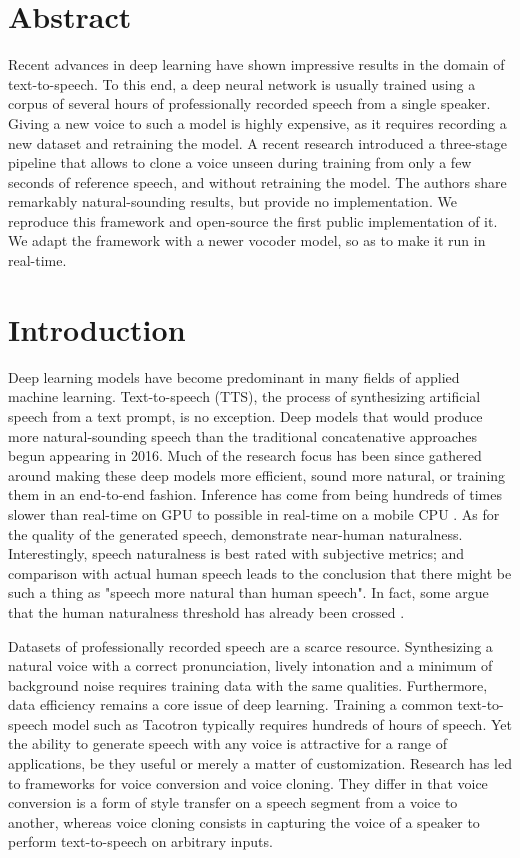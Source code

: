 \documentclass[a4paper, oneside, 12pt, english]{article}
\begin{document}
\section*{Abstract}
Recent advances in deep learning have shown impressive results in the domain of text-to-speech. To this end, a deep neural network is usually trained using a corpus of several hours of professionally recorded speech from a single speaker. Giving a new voice to such a model is highly expensive, as it requires recording a new dataset and retraining the model. A recent research introduced a three-stage pipeline that allows to clone a voice unseen during training from only a few seconds of reference speech, and without retraining the model. The authors share remarkably natural-sounding results, but provide no implementation. We reproduce this framework and open-source the first public implementation of it. We adapt the framework with a newer vocoder model, so as to make it run in real-time.
\clearpage

\tableofcontents
\clearpage

\section{Introduction}
Deep learning models have become predominant in many fields of applied machine learning. Text-to-speech (TTS), the process of synthesizing artificial speech from a text prompt, is no exception. Deep models that would produce more natural-sounding speech than the traditional concatenative approaches begun appearing in 2016. Much of the research focus has been since gathered around making these deep models more efficient, sound more natural, or training them in an end-to-end fashion. Inference has come from being hundreds of times slower than real-time on GPU \citep{WaveNet} to possible in real-time on a mobile CPU \citep{WaveRNN}. As for the quality of the generated speech, \citet{Tacotron2} demonstrate near-human naturalness. Interestingly, speech naturalness is best rated with subjective metrics; and comparison with actual human speech leads to the conclusion that there might be such a thing as "speech more natural than human speech". In fact, some argue that the human naturalness threshold has already been crossed \citep{MOSNaturalness}.

Datasets of professionally recorded speech are a scarce resource. Synthesizing a natural voice with a correct pronunciation, lively intonation and a minimum of background noise requires training data with the same qualities. Furthermore, data efficiency remains a core issue of deep learning. Training a common text-to-speech model such as Tacotron \citep{Tacotron1} typically requires hundreds of hours of speech. Yet the ability to generate speech with any voice is attractive for a range of applications, be they useful or merely a matter of customization. Research has led to frameworks for voice conversion and voice cloning. They differ in that voice conversion is a form of style transfer on a speech segment from a voice to another, whereas voice cloning consists in capturing the voice of a speaker to perform text-to-speech on arbitrary inputs. 
\end{document}
